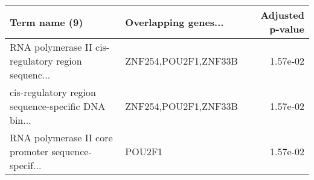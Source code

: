 \begin{tabular}{llr}
\toprule
                                     Term name (9) & Overlapping genes... &  Adjusted p-value \\
\midrule
RNA polymerase II cis-regulatory region sequenc... & ZNF254,POU2F1,ZNF33B &          1.57e-02 \\
cis-regulatory region sequence-specific DNA bin... & ZNF254,POU2F1,ZNF33B &          1.57e-02 \\
RNA polymerase II core promoter sequence-specif... &               POU2F1 &          1.57e-02 \\
\bottomrule
\end{tabular}
